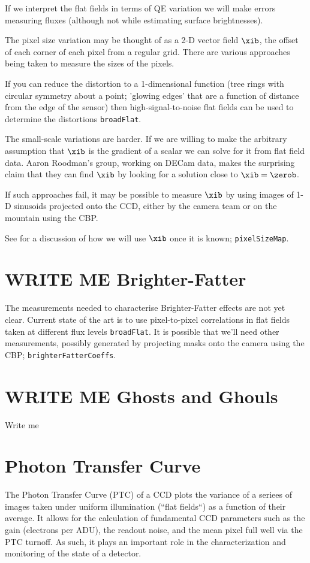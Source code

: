 \documentclass[DM,authoryear,toc,lsstdraft]{lsstdoc}
\newcommand{\inputData}[1]{\texttt{#1}}
\newcommand{\outputData}[1]{\texttt{#1}}
\begin{document}
If we interpret the flat fields in terms of QE variation we will make errors measuring fluxes (although
not while estimating surface brightnesses).

The pixel size variation may be thought of as a 2-D vector field $\xib$, the offset of each corner of each
pixel from a regular grid. There are various approaches being taken to measure the sizes of the pixels.

If you can reduce the distortion
to a 1-dimensional function (\eg tree rings with circular symmetry about a point; 'glowing edges' that are
a function of distance from the edge of the sensor) then high-signal-to-noise flat fields can be used to
determine the distortions \inputData{broadFlat}.

The small-scale variations are harder.  If we are willing to make the arbitrary assumption that $\xib$ is the
gradient of a scalar we can solve for it from flat field data.  Aaron Roodman's group, working on DECam data,
makes the surprising claim that they can find $\xib$ by looking for a solution close to $\xib = \zerob$.

If such approaches fail, it may be possible to measure $\xib$ by using images of 1-D sinusoids projected
onto the CCD, either by the camera team or on the mountain using the CBP.

See 
for a discussion of how we will use $\xib$ once it is known;
\outputData{pixelSizeMap}.

\section{WRITE ME Brighter-Fatter}

The measurements needed to characterise Brighter-Fatter effects are not yet clear.  Current state of the art
is to use pixel-to-pixel correlations in flat fields taken at different flux levels \inputData{broadFlat}.  It
is possible that we'll need other measurements, possibly generated by projecting masks onto the camera using
the CBP;  \outputData{brighterFatterCoeffs}.

\section{WRITE ME Ghosts and Ghouls}

Write me


\section{Photon Transfer Curve}
The Photon Transfer Curve (PTC) of a CCD plots the variance of a seriees of images taken under uniform illumination (``flat fields``) as a function of their average. It allows for the calculation of fundamental CCD parameters such as the gain (electrons per ADU), the readout noise, and the mean pixel full well via the PTC turnoff. As such, it plays an important role in the characterization and monitoring of the state of a detector.
\end{document}

